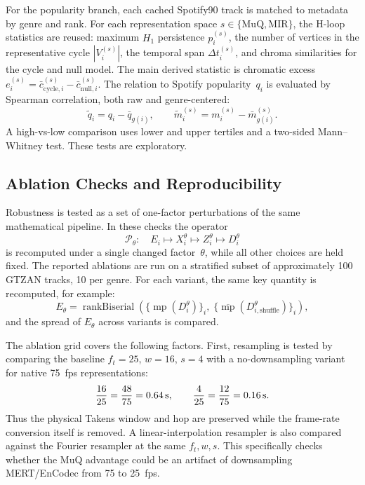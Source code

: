For the popularity branch, each cached Spotify90 track is matched to metadata by genre and rank. For each representation space $s\in\{\mathrm{MuQ},\mathrm{MIR}\}$, the H-loop statistics are reused: maximum $H_1$ persistence $p_i^{(s)}$, the number of vertices in the representative cycle $|V_i^{(s)}|$, the temporal span $\Delta t_i^{(s)}$, and chroma similarities for the cycle and null model. The main derived statistic is chromatic excess $e_i^{(s)}=\bar{c}_{\mathrm{cycle},i}^{(s)}-\bar{c}_{\mathrm{null},i}^{(s)}$. The relation to Spotify popularity~$q_i$ is evaluated by Spearman correlation, both raw and genre-centered:
\begin{equation}\label{eq:popularity}
\tilde{q}_i=q_i-\bar{q}_{g(i)},\qquad
\tilde{m}_i^{(s)}=m_i^{(s)}-\bar{m}_{g(i)}^{(s)}.
\end{equation}
A high-vs-low comparison uses lower and upper tertiles and a two-sided Mann--Whitney test. These tests are exploratory.

\subsection{Ablation Checks and Reproducibility}\label{ssec:ablation}

Robustness is tested as a set of one-factor perturbations of the same mathematical pipeline. In these checks the operator
\[
\mathcal P_\theta:\quad E_i\mapsto X_i^\theta\mapsto Z_i^\theta\mapsto D_i^\theta
\]
is recomputed under a single changed factor~$\theta$, while all other choices are held fixed. The reported ablations are run on a stratified subset of approximately 100 GTZAN tracks, 10 per genre. For each variant, the same key quantity is recomputed, for example:
\begin{equation}\label{eq:ablation}
E_\theta=\operatorname{rankBiserial}
\left(
\{\operatorname{mp}(D_i^\theta)\}_i,\;
\{\overline{\operatorname{mp}}(D_{i,\text{shuffle}}^\theta)\}_i
\right),
\end{equation}
and the spread of $E_\theta$ across variants is compared.

The ablation grid covers the following factors. First, resampling is tested by comparing the baseline $f_t=25$, $w=16$, $s=4$ with a no-downsampling variant for native 75~fps representations:
\[
\frac{16}{25}=\frac{48}{75}=0.64\text{\,s},\qquad
\frac{4}{25}=\frac{12}{75}=0.16\text{\,s}.
\]
Thus the physical Takens window and hop are preserved while the frame-rate conversion itself is removed. A linear-interpolation resampler is also compared against the Fourier resampler at the same $f_t,w,s$. This specifically checks whether the MuQ advantage could be an artifact of downsampling MERT/EnCodec from 75 to 25~fps.

